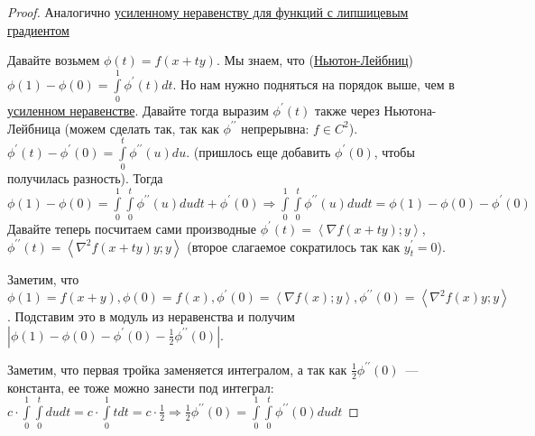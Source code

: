 

\begin{proof}
  Аналогично \hyperref[note:379E4CAD-A44B-4631-8DAF-F3DC708EAEDE]{усиленному неравенству для функций с липшицевым градиентом}

  Давайте возьмем $\phi(t) = f(x + ty)$. Мы знаем, что (\hyperref[note:AD362344-ECDC-4627-B344-8356744E6E53]{Ньютон-Лейбниц}) $\phi(1) - \phi(0)= \int\limits_0^1 \phi^{\prime}(t) dt$.
  Но нам нужно подняться на порядок выше, чем в \hyperref[note:379E4CAD-A44B-4631-8DAF-F3DC708EAEDE]{усиленном неравенстве}.
  Давайте тогда выразим $\phi^{\prime}(t)$ также через Ньютона-Лейбница (можем сделать так, так как $\phi^{\prime\prime}$ непрерывна: $f \in C^2$). $\phi^{\prime}(t) - \phi^{\prime}(0) = \int\limits_0^t \phi^{\prime\prime}(u) du$.  (пришлось еще добавить $\phi^{\prime}(0)$, чтобы получилась разность).
  Тогда $\phi(1) - \phi(0) = \int\limits_0^1 \int\limits_0^t \phi^{\prime\prime}(u) du dt + \phi^{\prime}(0)\Rightarrow \int\limits_0^1 \int\limits_0^t \phi^{\prime\prime}(u) du dt = \phi(1) - \phi(0) - \phi^{\prime}(0)$ \\
  Давайте теперь посчитаем сами производные
  $\phi^{\prime}(t) = \left\langle \nabla f(x + ty); y \right\rangle$, $\phi^{\prime\prime}(t) = \left\langle \nabla^2 f(x + ty)y; y \right\rangle$ (второе слагаемое сократилось так как $y^{\prime}_t = 0$).

  Заметим, что $\phi(1) = f(x+y), \phi(0) = f(x), \phi^{\prime}(0) = \left\langle \nabla f(x); y \right\rangle, \phi^{\prime\prime}(0) = \left\langle \nabla^2 f(x)y; y \right\rangle$.
  Подставим это в модуль из неравенства  и получим $\left| \phi(1) - \phi(0) - \phi^{\prime}(0) - \frac{1}{2} \phi^{\prime\prime} (0) \right|$.

  Заметим, что первая тройка заменяется интегралом, а так как $\frac{1}{2} \phi^{\prime\prime}(0)$~--- константа, ее тоже можно занести под интеграл: $c \cdot \int\limits_0^1 \int\limits_0^t du dt  = c \cdot \int\limits_0^1 t dt =  c \cdot \frac{1}{2} \Rightarrow \frac{1}{2}\phi^{\prime\prime}(0) = \int\limits_0^1 \int\limits_0^t \phi^{\prime\prime}(0) du dt$


\end{proof}

